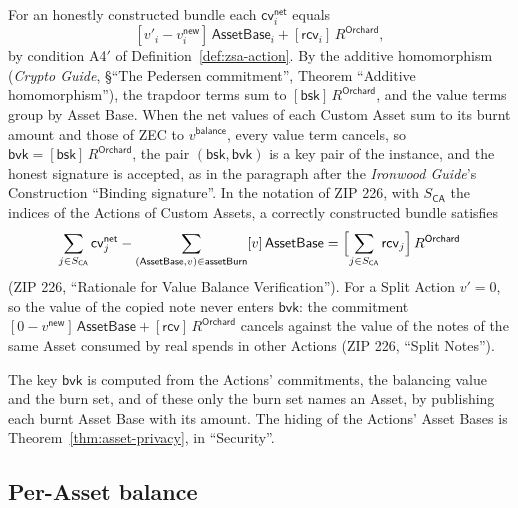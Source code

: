 \documentclass[11pt,a4paper]{article}
\theoremstyle{definition}
\newcommand{\cvsym}{\mathsf{cv}}
\newcommand{\rcv}{\ensuremath{\mathsf{rcv}}}
\begin{document}
For an honestly constructed bundle each $\cvsym^{\mathsf{net}}_i$ equals
\[
  [v'_i - v^{\mathsf{new}}_i]\,\mathsf{AssetBase}_i +
  [\rcv_i]\,R^{\mathsf{Orchard}},
\]
by condition A4$'$ of Definition~\ref{def:zsa-action}. By the additive
homomorphism (\emph{Crypto Guide}, \S``The Pedersen commitment'', Theorem
``Additive homomorphism''), the trapdoor terms sum to $[\mathsf{bsk}]\,
R^{\mathsf{Orchard}}$, and the value terms group by Asset Base. When the
net values of each Custom Asset sum to its burnt amount and those of ZEC to
$v^{\mathsf{balance}}$, every value term cancels, so
$\mathsf{bvk} = [\mathsf{bsk}]\,R^{\mathsf{Orchard}}$, the pair
$(\mathsf{bsk}, \mathsf{bvk})$ is a key pair of the instance, and the
honest signature is accepted, as in the paragraph after the \emph{Ironwood
Guide}'s Construction ``Binding signature''. In the notation of ZIP 226,
with $S_{\mathsf{CA}}$ the indices of the Actions of Custom Assets, a
correctly constructed bundle satisfies
\[
  \sum_{j \in S_{\mathsf{CA}}} \cvsym^{\mathsf{net}}_j
  - \sum_{(\mathsf{AssetBase}, v) \in \mathsf{assetBurn}}
    [v]\,\mathsf{AssetBase}
  = \Bigl[\sum_{j \in S_{\mathsf{CA}}} \rcv_j\Bigr]\,R^{\mathsf{Orchard}}
\]
(ZIP 226, ``Rationale for Value Balance Verification''). For a Split Action
$v' = 0$, so the value of the copied note never enters $\mathsf{bvk}$: the
commitment $[0 - v^{\mathsf{new}}]\,\mathsf{AssetBase} +
[\rcv]\,R^{\mathsf{Orchard}}$ cancels against the value of the notes of the
same Asset consumed by real spends in other Actions (ZIP 226, ``Split
Notes'').

The key $\mathsf{bvk}$ is computed from the Actions' commitments, the
balancing value and the burn set, and of these only the burn set names an
Asset, by publishing each burnt Asset Base with its amount. The hiding of
the Actions' Asset Bases is Theorem~\ref{thm:asset-privacy}, in
``Security''.

\subsection{Per-Asset balance}\label{sec:burn-balance}
\end{document}
